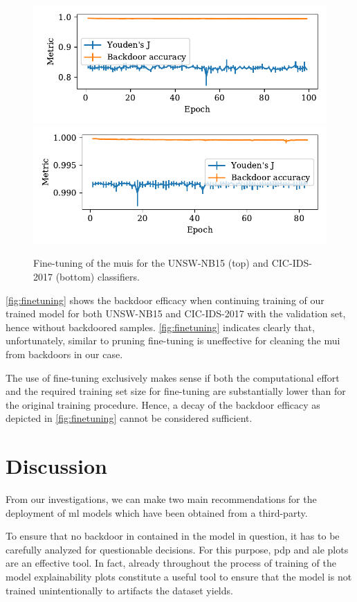 \documentclass[10pt,sigconf,letterpaper,dvipsnames]{acmart}
\begin{document}
\begin{figure}[t]
\includegraphics[width=\columnwidth]{figures/finetuning_2015.pdf}
\includegraphics[width=\columnwidth]{figures/finetuning_2017.pdf}
\caption{Fine-tuning of the \glspl{mui} for the UNSW-NB15 (top) and CIC-IDS-2017 (bottom) classifiers.}
\label{fig:finetuning}
\end{figure}
\autoref{fig:finetuning} shows the backdoor efficacy when continuing training of our trained model for both UNSW-NB15 and CIC-IDS-2017 with the validation set, hence without backdoored samples. 
\autoref{fig:finetuning} indicates clearly that, unfortunately, similar to pruning fine-tuning is uneffective for cleaning the \gls{mui} from backdoors in our case. 

The use of fine-tuning exclusively makes  sense if both the computational effort and the required training set size for fine-tuning are substantially lower than for the original training procedure. Hence, a decay of the backdoor efficacy as depicted in \autoref{fig:finetuning} cannot be considered sufficient.

\section{Discussion}
From our investigations, we can make two main recommendations for the deployment of \gls{ml} models which have been obtained from a third-party.

To ensure that no backdoor in contained in the model in question, it has to be carefully analyzed for questionable decisions. For this purpose, \gls{pdp} and \gls{ale} plots are an effective tool. In fact, already throughout the process of training of the model explainability plots constitute a useful tool to ensure that the model is not trained unintentionally to artifacts the dataset yields.
\end{document}
